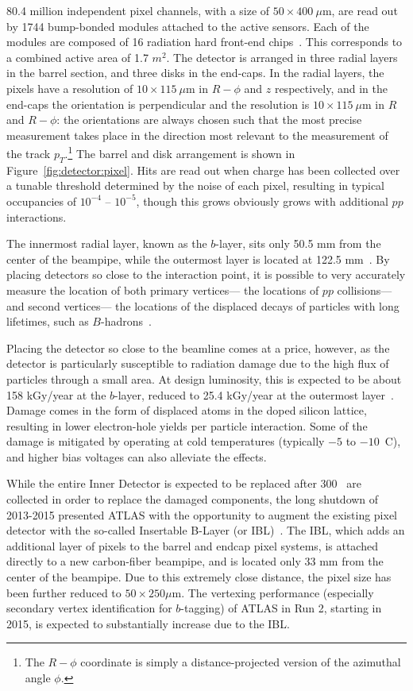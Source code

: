 80.4 million independent pixel channels, with a size of $50 \times 400~\mu$m, are read out by 1744 bump-bonded modules attached to the active sensors. Each of the modules are composed of 16 radiation hard front-end chips~\cite{ATLASPaper}. This corresponds to a combined active area of 1.7 $m^2$. The detector is arranged in three radial layers in the barrel section, and three disks in the end-caps. In the radial layers, the pixels have a resolution of $10 \times 115~\mu$m in $R-\phi$ and $z$ respectively, and in the end-caps the orientation is perpendicular and the resolution is $10 \times 115~\mu$m in $R$ and $R-\phi$: the orientations are always chosen such that the most precise measurement takes place in the direction most relevant to the measurement of the track $p_T$.\footnote{The $R-\phi$ coordinate is simply a distance-projected version of the azimuthal angle $\phi$.} The barrel and disk arrangement is shown in Figure~\ref{fig:detector:pixel}. Hits are read out when charge has been collected over a tunable threshold determined by the noise of each pixel, resulting in typical occupancies of $10^{-4}$ -- $10^{-5}$, though this grows obviously grows with additional $pp$ interactions.

The innermost radial layer, known as the $b$-layer, sits only 50.5 mm from the center of the beampipe, while the outermost layer is located at 122.5 mm~\cite{ATLASPaper}. By placing detectors so close to the interaction point, it is possible to very accurately measure the location of both  primary vertices--- the locations of $pp$ collisions--- and second vertices--- the locations of the displaced decays of particles with long lifetimes, such as $B$-hadrons~\cite{ATLASExpected}.

Placing the detector so close to the beamline comes at a price, however, as the detector is particularly susceptible to radiation damage due to the high flux of particles through a small area. At design luminosity, this is expected to be about 158 kGy/year at the $b$-layer, reduced to 25.4 kGy/year at the outermost layer~\cite{ATLASPaper}. Damage comes in the form of displaced atoms in the doped silicon lattice, resulting in lower electron-hole yields per particle interaction. Some of the damage is mitigated by operating at cold temperatures (typically $-5$ to $-10$\degree~C), and higher bias voltages can also alleviate the effects.

While the entire Inner Detector is expected to be replaced after 300 \ifb~are collected in order to replace the damaged components, the long shutdown of 2013-2015 presented ATLAS with the opportunity to augment the existing pixel detector with the so-called Insertable B-Layer (or IBL)~\cite{ATLASIBL}. The IBL, which adds an additional layer of pixels to the barrel and endcap pixel systems, is attached directly to a new carbon-fiber beampipe, and is located only 33 mm from the center of the beampipe. Due to this extremely close distance, the pixel size has been further reduced to $50 \times 250 \mu$m. The vertexing performance (especially secondary vertex identification for $b$-tagging) of ATLAS in Run 2, starting in 2015, is expected to substantially increase due to the IBL. 


